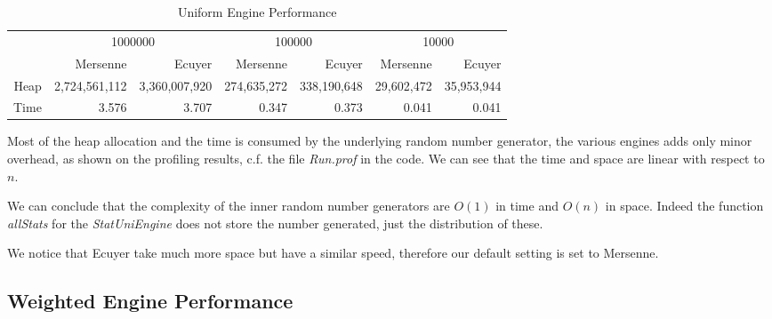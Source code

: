\documentclass[12pt,a4paper,titlepage]{article}
\begin{document}
\begin{table}[htbp!]
  \centering \tiny
    \begin{tabular}{r|rrrrrr}
    \multicolumn{1}{r}{} & \multicolumn{2}{c}{1000000} & \multicolumn{2}{c}{100000} & \multicolumn{2}{c}{10000} \\
    \multicolumn{1}{r}{} & Mersenne & Ecuyer & Mersenne & Ecuyer & Mersenne & Ecuyer \\
\cmidrule{2-7}    Heap  & 2,724,561,112 & 3,360,007,920 & 274,635,272 & 338,190,648 & 29,602,472 & 35,953,944 \\
    Time  & 3.576 & 3.707 & 0.347 & 0.373 & 0.041 & 0.041 \\
    \end{tabular}%
  \caption{Uniform Engine Performance}
  \label{tab:uni.perf}%
\end{table}%

Most of the heap allocation and the time is consumed by the underlying 
random number generator, the various engines adds only minor overhead, 
as shown on the profiling results, c.f. the file \emph{Run.prof} in the code.
We can see that the time and space are linear with respect to $n$. 

We can conclude that the complexity of the inner random number generators
are $O(1)$ in time and $O(n)$ in space. Indeed the function \emph{allStats} for the
\emph{StatUniEngine} does not store the number generated, 
just the distribution of these.

We notice that Ecuyer take much more space but have a similar speed, 
therefore our default setting
is set to Mersenne.

\subsection{Weighted Engine Performance}
\end{document}
